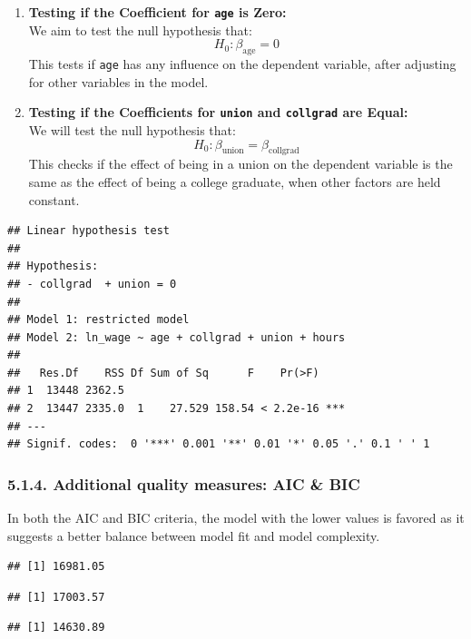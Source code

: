 \documentclass[
]{article}
\begin{document}
\begin{enumerate}
\def\labelenumi{\arabic{enumi}.}
\item
  \textbf{Testing if the Coefficient for \texttt{age} is Zero:}\\
  We aim to test the null hypothesis that: \begin{equation}
  H_0: \beta_{\text{age}} = 0
  \end{equation} This tests if \texttt{age} has any influence on the
  dependent variable, after adjusting for other variables in the model.
\item
  \textbf{Testing if the Coefficients for \texttt{union} and
  \texttt{collgrad} are Equal:}\\
  We will test the null hypothesis that: \begin{equation}
  H_0: \beta_{\text{union}} = \beta_{\text{collgrad}}
  \end{equation} This checks if the effect of being in a union on the
  dependent variable is the same as the effect of being a college
  graduate, when other factors are held constant.
\end{enumerate}

\begin{verbatim}
## Linear hypothesis test
## 
## Hypothesis:
## - collgrad  + union = 0
## 
## Model 1: restricted model
## Model 2: ln_wage ~ age + collgrad + union + hours
## 
##   Res.Df    RSS Df Sum of Sq      F    Pr(>F)    
## 1  13448 2362.5                                  
## 2  13447 2335.0  1    27.529 158.54 < 2.2e-16 ***
## ---
## Signif. codes:  0 '***' 0.001 '**' 0.01 '*' 0.05 '.' 0.1 ' ' 1
\end{verbatim}

\subsubsection{5.1.4. Additional quality measures: AIC \&
BIC}\label{additional-quality-measures-aic-bic}

In both the AIC and BIC criteria, the model with the lower values is
favored as it suggests a better balance between model fit and model
complexity.

\begin{verbatim}
## [1] 16981.05
\end{verbatim}

\begin{verbatim}
## [1] 17003.57
\end{verbatim}

\begin{verbatim}
## [1] 14630.89
\end{verbatim}
\end{document}
